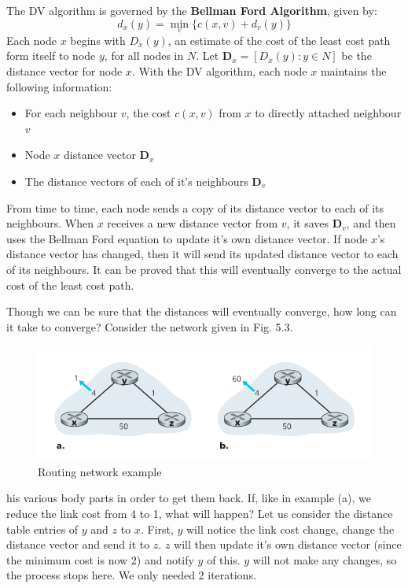 \documentclass[12pt,letterpaper]{book}
\theoremstyle{definition}
\begin{document}
The DV algorithm is governed by the \textbf{Bellman Ford Algorithm}, given by:
\[d_x (y) = \min_v \{c(x,v) + d_v(y)\}\]
Each node $x$ begins with $D_x(y)$, an estimate of the cost of the least cost path form itself to node $y$, for all nodes in $N$. Let $\mathbf{D}_x = [D_x(y) : y \in N]$ be the distance vector for node $x$. With the DV algorithm, each node $x$ maintains the following information:
\begin{itemize}
  \item For each neighbour $v$, the cost $c(x,v)$ from $x$ to directly attached neighbour $v$
  \item Node $x$ distance vector $\mathbf{D}_x$
  \item The distance vectors of each of it's neighbours $\mathbf{D}_v$
\end{itemize}
From time to time, each node sends a copy of its distance vector to each of its neighbours. When $x$ receives a new distance vector from $v$, it saves $\mathbf{D}_v$, and then uses the Bellman Ford equation to update it's own distance vector.
If node $x$'s distance vector has changed, then it will send its updated distance vector to each of its neighbours. It can be proved that this will eventually converge to the actual cost of the least cost path.

Though we can be sure that the distances will eventually converge, how long can it take to converge? Consider the network given in Fig. 5.3.

\begin{figure}[htpb]
  \centering
  \includegraphics[width=0.8\linewidth]{./assets/dv_eg.png}
  \caption{Routing network example}%
  \label{fig:}
\end{figure}
his various body parts in order to get them back. 
If, like in example (a), we reduce the link cost from 4 to 1, what will happen? Let us consider the distance table entries of $y$ and $z$ to $x$. First, $y$ will notice the link cost change, change the distance vector and send it to $z$. $z$ will then update it's own distance vector (since the minimum cost is now 2) and notify $y$ of this. $y$ will not make any changes, so the process stops here. We only needed 2 iterations.
\end{document}
